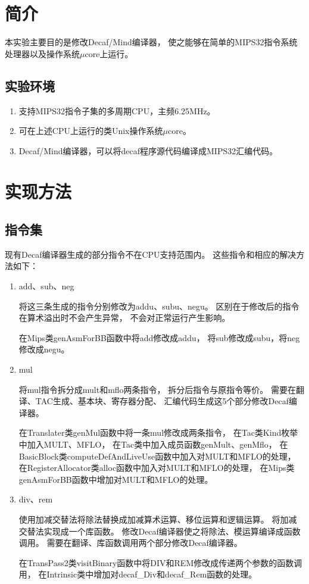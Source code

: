 \section{简介}
    本实验主要目的是修改Decaf/Mind编译器，%
    使之能够在简单的MIPS32指令系统处理器以及操作系统$\mu$core上运行。
    \subsection*{实验环境}
    \begin{enumerate}
        \item
        支持MIPS32指令子集的多周期CPU，主频6.25MHz。
        \item
        可在上述CPU上运行的类Unix操作系统$\mu$core。
        \item
        Decaf/Mind编译器，可以将decaf程序源代码编译成MIPS32汇编代码。
    \end{enumerate}

\section{实现方法}
    \subsection{指令集}
        现有Decaf编译器生成的部分指令不在CPU支持范围内。%
        这些指令和相应的解决方法如下：
        \begin{enumerate}
        \item
        add、sub、neg
            
        将这三条生成的指令分别修改为addu、subu、negu。%
        区别在于修改后的指令在算术溢出时不会产生异常，%
        不会对正常运行产生影响。

        在Mips类genAsmForBB函数中将add修改成addu，%
        将sub修改成subu，将neg修改成negu。
        \item
        mul

        将mul指令拆分成mult和mflo两条指令，%
        拆分后指令与原指令等价。%
        需要在翻译、TAC生成、基本块、寄存器分配、%
        汇编代码生成这5个部分修改Decaf编译器。

        在Translater类genMul函数中将一条mul修改成两条指令，%
        在Tac类Kind枚举中加入MULT、MFLO，%
        在Tac类中加入成员函数genMult、genMflo，%
        在BasicBlock类computeDefAndLiveUse函数中加入对MULT和MFLO的处理，%
        在RegisterAllocator类alloc函数中加入对MULT和MFLO的处理，%
        在Mips类genAsmForBB函数中增加对MULT和MFLO的处理。

        \item
        div、rem

        使用加减交替法将除法替换成加减算术运算、移位运算和逻辑运算。%
        将加减交替法实现成一个库函数。%
        修改Decaf编译器使之将除法、模运算编译成函数调用。%
        需要在翻译、库函数调用两个部分修改Decaf编译器。

        在TransPass2类visitBinary函数中将DIV和REM修改成传递两个参数的函数调用，%
        在Intrinsic类中增加对decaf\_Div和decaf\_Rem函数的处理。
        \end{enumerate}

